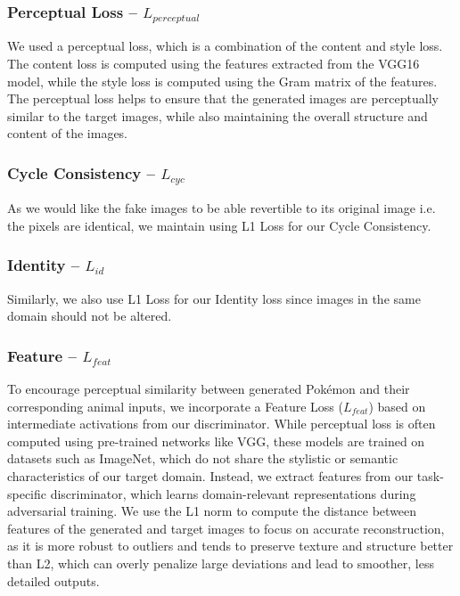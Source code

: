\documentclass[twoside,english,notitlepage]{report}
\begin{document}
\subsubsection{Perceptual Loss – $L_{perceptual}$}\label{task2:generator:loss:perceptual}
We used a perceptual loss, which is a combination of the content and style loss. The content loss is computed using the features extracted from the VGG16 model, while the style loss is computed using the Gram matrix of the features. The perceptual loss helps to ensure that the generated images are perceptually similar to the target images, while also maintaining the overall structure and content of the images.

\subsubsection{Cycle Consistency – $L_{cyc}$}
As we would like the fake images to be able revertible to its original image i.e. the pixels are identical, we maintain using L1 Loss for our Cycle Consistency.

\subsubsection{Identity – $L_{id}$}
Similarly, we also use L1 Loss for our Identity loss since images in the same domain should not be altered. 
\subsubsection{Feature – $L_{feat}$}
To encourage perceptual similarity between generated Pokémon and their corresponding animal inputs, we incorporate a Feature Loss ($L_{feat}$) based on intermediate activations from our discriminator. While perceptual loss is often computed using pre-trained networks like VGG, these models are trained on datasets such as ImageNet, which do not share the stylistic or semantic characteristics of our target domain. Instead, we extract features from our task-specific discriminator, which learns domain-relevant representations during adversarial training. We use the L1 norm to compute the distance between features of the generated and target images to focus on accurate reconstruction, as it is more robust to outliers and tends to preserve texture and structure better than L2, which can overly penalize large deviations and lead to smoother, less detailed outputs.
\end{document}
